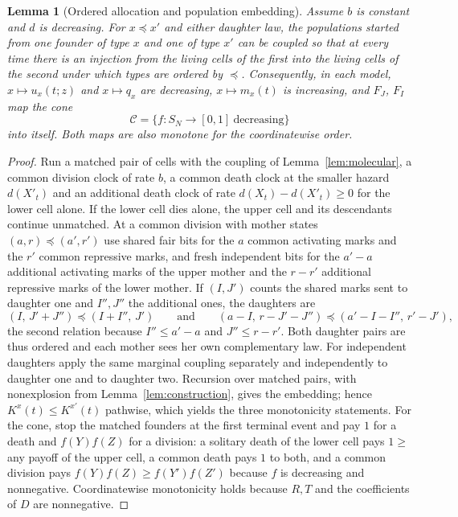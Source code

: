 \documentclass[11pt]{article}
\newtheorem{lemma}[theorem]{Lemma}
\theoremstyle{remark}
\begin{document}
\begin{lemma}[Ordered allocation and population embedding]\label{lem:embedding}
Assume $b$ is constant and $d$ is decreasing. For $x\preceq x'$ and either
daughter law, the populations started from one founder of type $x$ and one of
type $x'$ can be coupled so that at every time there is an injection from the
living cells of the first into the living cells of the second under which
types are ordered by $\preceq$. Consequently, in each model,
$x\mapsto u_x(t;z)$ and $x\mapsto q_x$ are decreasing, $x\mapsto m_x(t)$ is
increasing, and $F_J$, $F_I$ map the cone
\[
 \mathcal C=\{f:S_N\to[0,1]\ \text{decreasing}\}
\]
into itself. Both maps are also monotone for the coordinatewise order.
\end{lemma}
\begin{proof}
Run a matched pair of cells with the coupling of Lemma~\ref{lem:molecular},
a common division clock of rate $b$, a common death clock at the smaller
hazard $d(X'_t)$ and an additional death clock of rate $d(X_t)-d(X'_t)\ge0$
for the lower cell alone. If the lower cell dies alone, the upper cell and
its descendants continue unmatched. At a common division with mother states
$(a,r)\preceq(a',r')$ use shared fair bits for the $a$ common activating
marks and the $r'$ common repressive marks, and fresh independent bits for
the $a'-a$ additional activating marks of the upper mother and the $r-r'$
additional repressive marks of the lower mother. If $(I,J')$ counts the
shared marks sent to daughter one and $I'',J''$ the additional ones, the
daughters are
\[
 (I,\,J'+J'')\preceq(I+I'',\,J')\qquad\text{and}\qquad
 (a-I,\,r-J'-J'')\preceq(a'-I-I'',\,r'-J') ,
\]
the second relation because $I''\le a'-a$ and $J''\le r-r'$. Both daughter
pairs are thus ordered and each mother sees her own complementary law. For
independent daughters apply the same marginal coupling separately and
independently to daughter one and to daughter two. Recursion over matched
pairs, with nonexplosion from Lemma~\ref{lem:construction}, gives the
embedding; hence $K^{x}(t)\le K^{x'}(t)$ pathwise, which yields the three
monotonicity statements. For the cone, stop the matched founders at the first
terminal event and pay $1$ for a death and $f(Y)f(Z)$ for a division: a
solitary death of the lower cell pays $1\ge$ any payoff of the upper cell, a
common death pays $1$ to both, and a common division pays
$f(Y)f(Z)\ge f(Y')f(Z')$ because $f$ is decreasing and nonnegative.
Coordinatewise monotonicity holds because $R,T$ and the coefficients of $D$
are nonnegative.
\end{proof}
\end{document}
